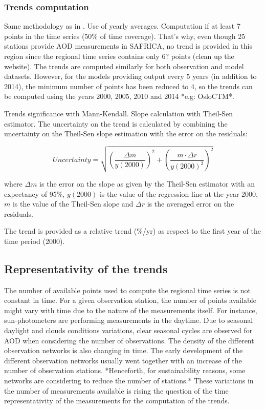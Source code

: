 \documentclass[journal abbreviation, manuscript]{copernicus}
\begin{document}
\subsubsection{Trends computation}
Same methodology as in \cite{aas2019global}.
Use of yearly averages. Computation if at least 7 points in the time series (50\% of time coverage). That's why, even though 25 stations provide AOD measurements in SAFRICA, no trend is provided in this region since the regional time series contains only 6? points (clean up the website). The trends are computed similarly for both observation and model datasets. However, for the models providing output every 5 years (in addition to 2014), the minimum number of points has been reduced to 4, so the trends can be computed using the years 2000, 2005, 2010 and 2014 *e.g: OsloCTM*.

Trends significance with Mann-Kendall.
Slope calculation with Theil-Sen estimator.
The uncertainty on the trend is calculated by combining the uncertainty on the Theil-Sen slope estimation with the error on the residuals:

\begin{equation}
 Uncertainty = \sqrt{{\left (\frac{\Delta m}{y(2000)}\right )}^{2} + {\left ( \frac{m \cdot \Delta r}{y(2000)^2}\right )}^{2} }
\end{equation}

where $\Delta m$ is the error on the slope as given by the Theil-Sen estimator with an expectancy of 95\%, $y(2000)$ is the value of the regression line at the year 2000, $m$ is the value of the Theil-Sen slope and $\Delta r$ is the averaged error on the residuals.

The trend is provided as a relative trend (\%/yr) as respect to the first year of the time period (2000).

\subsection{Representativity of the trends}
The number of available points used to compute the regional time series is not constant in time. For a given observation station, the number of points available might vary with time due to the nature of the measurements itself. For instance, sun-photometers are performing measurements in the daytime. Due to seasonal daylight and clouds conditions variations, clear seasonal cycles are observed for AOD when considering the number of observations. The density of the different observation networks is also changing in time. The early development of the different observation networks usually went together with an increase of the number of observation stations. *Henceforth, for sustainability reasons, some networks are considering to reduce the number of stations.* These variations in the number of measurements available is rising the question of the time representativity of the measurements for the computation of the trends.
\end{document}
